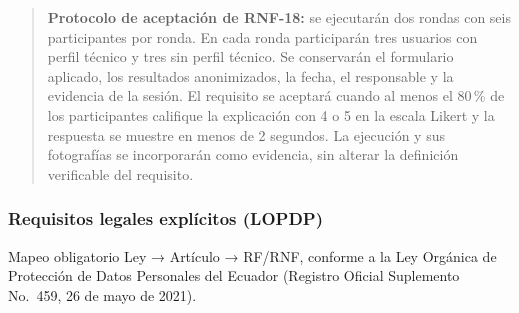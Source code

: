 \documentclass[11pt,a4paper]{article}
\begin{document}
	\begin{quote}
		\textbf{Protocolo de aceptación de RNF-18:} se ejecutarán dos rondas con seis participantes por ronda. En cada ronda participarán tres usuarios con perfil técnico y tres sin perfil técnico. Se conservarán el formulario aplicado, los resultados anonimizados, la fecha, el responsable y la evidencia de la sesión. El requisito se aceptará cuando al menos el 80\,\% de los participantes califique la explicación con 4 o 5 en la escala Likert y la respuesta se muestre en menos de 2 segundos. La ejecución y sus fotografías se incorporarán como evidencia, sin alterar la definición verificable del requisito.
	\end{quote}
	
	\subsubsection{ Requisitos legales explícitos (LOPDP)}
	
	Mapeo obligatorio Ley → Artículo → RF/RNF, conforme a la Ley Orgánica de Protección de Datos Personales del Ecuador (Registro Oficial Suplemento No.~459, 26 de mayo de 2021).
	
\end{document}

